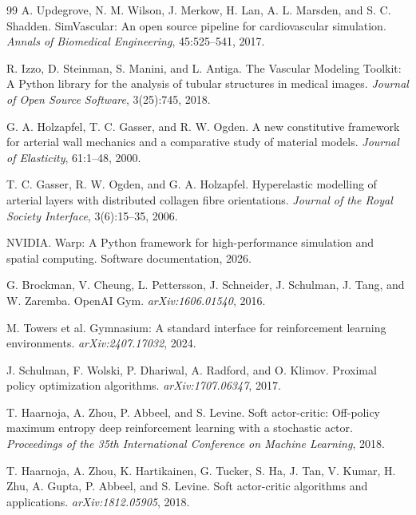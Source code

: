 \documentclass[11pt]{article}
\begin{document}
\begin{thebibliography}{99}
A. Updegrove, N. M. Wilson, J. Merkow, H. Lan, A. L. Marsden, and S. C. Shadden.
\newblock SimVascular: An open source pipeline for cardiovascular simulation.
\newblock \emph{Annals of Biomedical Engineering}, 45:525--541, 2017.

R. Izzo, D. Steinman, S. Manini, and L. Antiga.
\newblock The Vascular Modeling Toolkit: A Python library for the analysis of tubular structures in medical images.
\newblock \emph{Journal of Open Source Software}, 3(25):745, 2018.

G. A. Holzapfel, T. C. Gasser, and R. W. Ogden.
\newblock A new constitutive framework for arterial wall mechanics and a comparative study of material models.
\newblock \emph{Journal of Elasticity}, 61:1--48, 2000.

T. C. Gasser, R. W. Ogden, and G. A. Holzapfel.
\newblock Hyperelastic modelling of arterial layers with distributed collagen fibre orientations.
\newblock \emph{Journal of the Royal Society Interface}, 3(6):15--35, 2006.

NVIDIA.
\newblock Warp: A Python framework for high-performance simulation and spatial computing.
\newblock Software documentation, 2026.

G. Brockman, V. Cheung, L. Pettersson, J. Schneider, J. Schulman, J. Tang, and W. Zaremba.
\newblock OpenAI Gym.
\newblock \emph{arXiv:1606.01540}, 2016.

M. Towers et al.
\newblock Gymnasium: A standard interface for reinforcement learning environments.
\newblock \emph{arXiv:2407.17032}, 2024.

J. Schulman, F. Wolski, P. Dhariwal, A. Radford, and O. Klimov.
\newblock Proximal policy optimization algorithms.
\newblock \emph{arXiv:1707.06347}, 2017.

T. Haarnoja, A. Zhou, P. Abbeel, and S. Levine.
\newblock Soft actor-critic: Off-policy maximum entropy deep reinforcement learning with a stochastic actor.
\newblock \emph{Proceedings of the 35th International Conference on Machine Learning}, 2018.

T. Haarnoja, A. Zhou, K. Hartikainen, G. Tucker, S. Ha, J. Tan, V. Kumar, H. Zhu, A. Gupta, P. Abbeel, and S. Levine.
\newblock Soft actor-critic algorithms and applications.
\newblock \emph{arXiv:1812.05905}, 2018.


\end{thebibliography}
\end{document}
